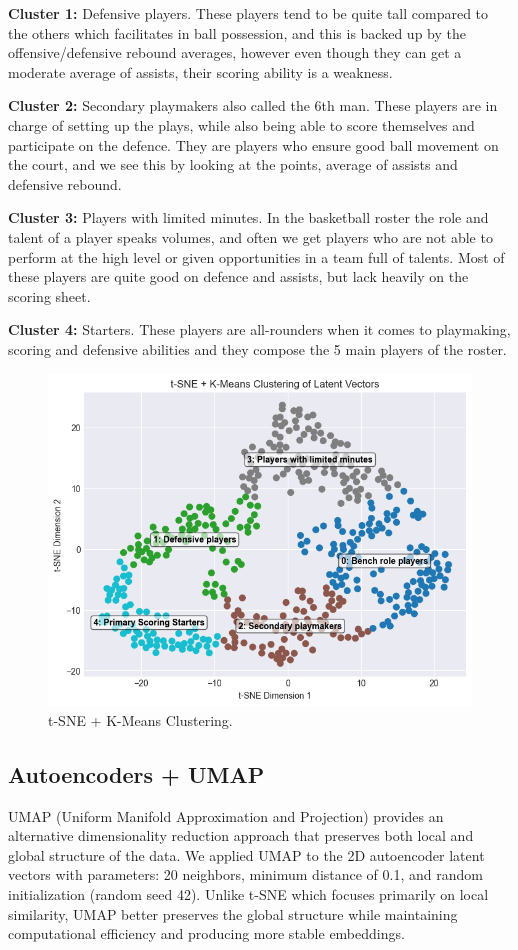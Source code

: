 \documentclass{article}
\begin{document}
{\bf Cluster 1:} Defensive players. These players tend to be quite tall compared to the others which facilitates in ball possession, and this is backed up by the offensive/defensive rebound averages, however even though they can get a moderate average of assists, their scoring ability is a weakness.

{\bf Cluster 2:} Secondary playmakers also called the 6th man. These players are in charge of setting up the plays, while also being able to score themselves and participate on the defence. They are players who ensure good ball movement on the court, and we see this by looking at the points, average of assists and defensive rebound. 

{\bf Cluster 3:} Players with limited minutes. In the basketball roster the role and talent of a player speaks volumes, and often we get players who are not able to perform at the high level or given opportunities in a team full of talents. Most of these players are quite good on defence and assists, but lack heavily on the scoring sheet.

{\bf Cluster 4:} Starters. These players are all-rounders when it comes to playmaking, scoring and defensive abilities and they compose the 5 main players of the roster.

\begin{figure}[h]
    \centering
    \includegraphics[width=0.7\linewidth]{media/2c.png}
    \caption{t-SNE + K-Means Clustering.}
\end{figure}

\subsection{Autoencoders + UMAP}

UMAP (Uniform Manifold Approximation and Projection) provides an alternative dimensionality reduction approach that preserves both local and global structure of the data. We applied UMAP to the 2D autoencoder latent vectors with parameters: 20 neighbors, minimum distance of 0.1, and random initialization (random seed 42). Unlike t-SNE which focuses primarily on local similarity, UMAP better preserves the global structure while maintaining computational efficiency and producing more stable embeddings.
\end{document}
